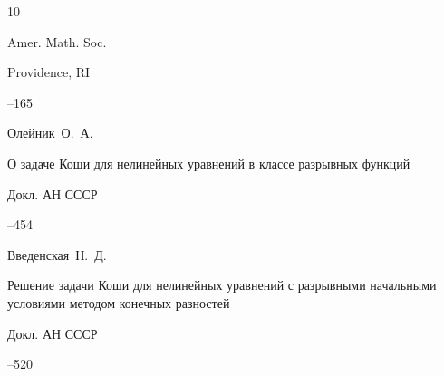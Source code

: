 \begin{thebibliography}{10}

\publ Amer. Math. Soc.

\publaddr Providence, RI

--165







\by Олейник~О.~А.

\paper О задаче Коши для нелинейных уравнений в классе разрывных функций

\jour Докл. АН СССР




--454





\by Введенская~Н.~Д.

\paper Решение задачи Коши для нелинейных уравнений с разрывными начальными условиями методом конечных разностей

\jour Докл. АН СССР



--520
















%

%

%

%

%








%

%

%


\end{thebibliography}
